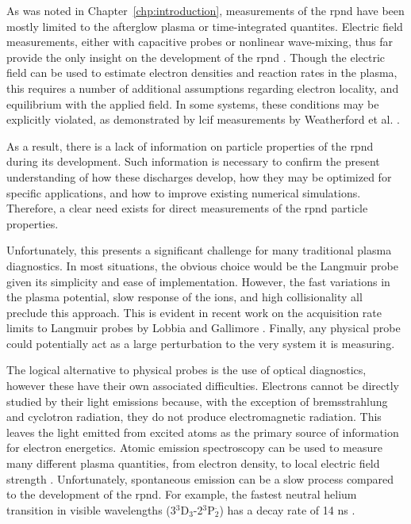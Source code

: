 As was noted in Chapter~\ref{chp:introduction}, measurements of the \acs{rpnd}
have been mostly limited to the afterglow plasma or time-integrated quantites.
Electric field measurements, either with capacitive probes or nonlinear
wave-mixing, thus far provide the only insight on the development of the
\acs{rpnd} \cite{Ito2010, Muller2011a, Takashima2011}. Though the electric field
can be used to estimate electron densities and reaction rates in the plasma,
this requires a number of additional assumptions regarding electron locality,
and equilibrium with the applied field. In some systems, these conditions may be
explicitly violated, as demonstrated by \acs{lcif} measurements by Weatherford
et al. \cite{Weatherford2012}.

As a result, there is a lack of information on particle properties of the
\acs{rpnd} during its development. Such information is necessary to confirm the
present understanding of how these discharges develop, how they may be optimized
for specific applications, and how to improve existing numerical simulations.
Therefore, a clear need exists for direct measurements of the \acs{rpnd}
particle properties.

Unfortunately, this presents a significant challenge for many traditional plasma
diagnostics. In most situations, the obvious choice would be the Langmuir probe
given its simplicity and ease of implementation. However, the fast variations in
the plasma potential, slow response of the ions, and high collisionality all
preclude this approach. This is evident in recent work on the acquisition rate
limits to Langmuir probes by Lobbia and Gallimore \cite{Lobbia2010}. Finally,
any physical probe could potentially act as a large perturbation to the very
system it is measuring.

The logical alternative to physical probes is the use of optical diagnostics,
however these have their own associated difficulties. Electrons cannot be
directly studied by their light emissions because, with the exception of
bremsstrahlung and cyclotron radiation, they do not produce electromagnetic
radiation. This leaves the light emitted from excited atoms as the primary
source of information for electron energetics. Atomic emission spectroscopy can
be used to measure many different plasma quantities, from electron density, to
local electric field strength \cite{Griem2005}. Unfortunately, spontaneous
emission can be a slow process compared to the development of the \acs{rpnd}.
For example, the fastest neutral helium transition in visible wavelengths
(3$^3$D$_3$-2$^3$P$_2^\cdot$) has a decay rate of 14 ns \cite{Kramida2012}.

